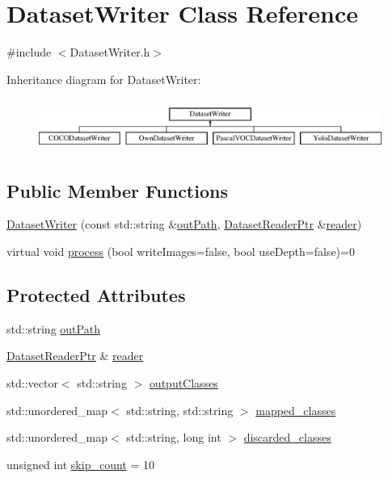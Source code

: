\hypertarget{class_dataset_writer}{}\section{Dataset\+Writer Class Reference}
\label{class_dataset_writer}


{\ttfamily \#include $<$Dataset\+Writer.\+h$>$}

Inheritance diagram for Dataset\+Writer\+:\begin{figure}[H]
\begin{center}
\leavevmode
\includegraphics[height=1.728395cm]{class_dataset_writer}
\end{center}
\end{figure}
\subsection*{Public Member Functions}
\begin{DoxyCompactItemize}
\item 
\hyperlink{class_dataset_writer_a96cb64791602cd684ec3a05156a7c28e}{Dataset\+Writer} (const std\+::string \&\hyperlink{class_dataset_writer_ac19eabc3e69f6e9bc4c5185803eed626}{out\+Path}, \hyperlink{_dataset_reader_8h_a30d89cba514a220d64d04535c0465f1c}{Dataset\+Reader\+Ptr} \&\hyperlink{class_dataset_writer_a2edef70c0de507a2e056eb3984705811}{reader})
\item 
virtual void \hyperlink{class_dataset_writer_a97270b2e182e6c08d9342d8db42710fd}{process} (bool write\+Images=false, bool use\+Depth=false)=0
\end{DoxyCompactItemize}
\subsection*{Protected Attributes}
\begin{DoxyCompactItemize}
\item 
std\+::string \hyperlink{class_dataset_writer_ac19eabc3e69f6e9bc4c5185803eed626}{out\+Path}
\item 
\hyperlink{_dataset_reader_8h_a30d89cba514a220d64d04535c0465f1c}{Dataset\+Reader\+Ptr} \& \hyperlink{class_dataset_writer_a2edef70c0de507a2e056eb3984705811}{reader}
\item 
std\+::vector$<$ std\+::string $>$ \hyperlink{class_dataset_writer_a55b8888beec78365ed6ea9b057a2d17b}{output\+Classes}
\item 
std\+::unordered\+\_\+map$<$ std\+::string, std\+::string $>$ \hyperlink{class_dataset_writer_a44b65963ebc0c9146e29802658627031}{mapped\+\_\+classes}
\item 
std\+::unordered\+\_\+map$<$ std\+::string, long int $>$ \hyperlink{class_dataset_writer_a978c35196e9b3be5dcd7ef3cb7c968c5}{discarded\+\_\+classes}
\item 
unsigned int \hyperlink{class_dataset_writer_a2c5c9a2670a4acb12278284668af7970}{skip\+\_\+count} = 10
\end{DoxyCompactItemize}


